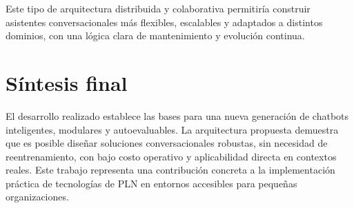 Este tipo de arquitectura distribuida y colaborativa permitiría construir asistentes conversacionales más flexibles, escalables y adaptados a distintos dominios, con una lógica clara de mantenimiento y evolución continua.

\section{Síntesis final}

El desarrollo realizado establece las bases para una nueva generación de chatbots inteligentes, modulares y autoevaluables. La arquitectura propuesta demuestra que es posible diseñar soluciones conversacionales robustas, sin necesidad de reentrenamiento, con bajo costo operativo y aplicabilidad directa en contextos reales. Este trabajo representa una contribución concreta a la implementación práctica de tecnologías de PLN en entornos accesibles para pequeñas organizaciones.
